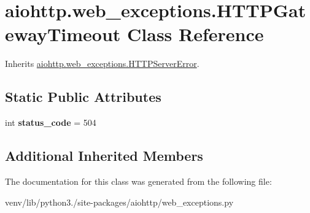 \hypertarget{classaiohttp_1_1web__exceptions_1_1_h_t_t_p_gateway_timeout}{}\section{aiohttp.\+web\+\_\+exceptions.\+H\+T\+T\+P\+Gateway\+Timeout Class Reference}
\label{classaiohttp_1_1web__exceptions_1_1_h_t_t_p_gateway_timeout}


Inherits \hyperlink{classaiohttp_1_1web__exceptions_1_1_h_t_t_p_server_error}{aiohttp.\+web\+\_\+exceptions.\+H\+T\+T\+P\+Server\+Error}.

\subsection*{Static Public Attributes}
\begin{DoxyCompactItemize}
\item 
\mbox{\label{classaiohttp_1_1web__exceptions_1_1_h_t_t_p_gateway_timeout_a008ee8f24601c1ae0515ee05251994a4}} 
int {\bfseries status\+\_\+code} = 504
\end{DoxyCompactItemize}
\subsection*{Additional Inherited Members}


The documentation for this class was generated from the following file\+:\begin{DoxyCompactItemize}
\item 
venv/lib/python3./site-\/packages/aiohttp/web\+\_\+exceptions.\+py\end{DoxyCompactItemize}
